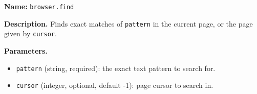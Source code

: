 \begin{custombox}[title=Tool Prompt: Find]
\label{box:tool-find}
\textbf{Name:} \texttt{browser.find}

\vspace{4pt}

\textbf{Description.}
Finds exact matches of \texttt{pattern} in the current page, or the page given by \texttt{cursor}.

\vspace{4pt}

\textbf{Parameters.}
\begin{itemize}[leftmargin=5pt, itemsep=0pt, parsep=0pt]
\item \texttt{pattern} (string, required): the exact text pattern to search for.
\item \texttt{cursor} (integer, optional, default -1): page cursor to search in.
\end{itemize}
\end{custombox}
